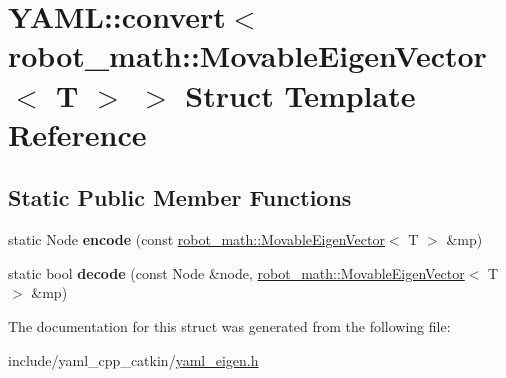 \hypertarget{structYAML_1_1convert_3_01robot__math_1_1MovableEigenVector_3_01T_01_4_01_4}{}\section{Y\+A\+ML\+:\+:convert$<$ robot\+\_\+math\+:\+:Movable\+Eigen\+Vector$<$ T $>$ $>$ Struct Template Reference}
\label{structYAML_1_1convert_3_01robot__math_1_1MovableEigenVector_3_01T_01_4_01_4}
\subsection*{Static Public Member Functions}
\begin{DoxyCompactItemize}
\item 
\mbox{\label{structYAML_1_1convert_3_01robot__math_1_1MovableEigenVector_3_01T_01_4_01_4_a1eaba2e3451344a859914e8a781d542e}} 
static Node {\bfseries encode} (const \hyperlink{structrobot__math_1_1MovableEigenVector}{robot\+\_\+math\+::\+Movable\+Eigen\+Vector}$<$ T $>$ \&mp)
\item 
\mbox{\label{structYAML_1_1convert_3_01robot__math_1_1MovableEigenVector_3_01T_01_4_01_4_a31a0b4061fd234b46a046cb9f87994f2}} 
static bool {\bfseries decode} (const Node \&node, \hyperlink{structrobot__math_1_1MovableEigenVector}{robot\+\_\+math\+::\+Movable\+Eigen\+Vector}$<$ T $>$ \&mp)
\end{DoxyCompactItemize}


The documentation for this struct was generated from the following file\+:\begin{DoxyCompactItemize}
\item 
include/yaml\+\_\+cpp\+\_\+catkin/\hyperlink{yaml__eigen_8h}{yaml\+\_\+eigen.\+h}\end{DoxyCompactItemize}
